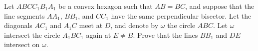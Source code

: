 Let $ABCC_1B_1A_1$ be a convex hexagon such that $AB = BC$, and suppose that the line segments $AA_1$, $BB_1$, and $CC_1$ have the same perpendicular bisector. Let the diagonals $AC_1$ and $A_1C$ meet at $D$, and denote by $\omega$ the circle $ABC$. Let $\omega$ intersect the circle $A_1BC_1$ again at $E \neq B$. Prove that the lines $BB_1$ and $DE$ intersect on $\omega$.

